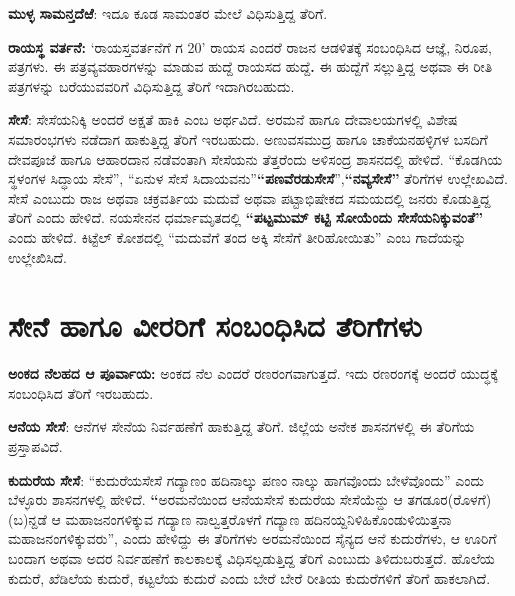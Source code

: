 \textbf{ಮುಳ್ಳ ಸಾಮನ್ತದೆಱೆ}: ಇದೂ ಕೂಡ ಸಾಮಂತರ ಮೇಲೆ ವಿಧಿಸುತ್ತಿದ್ದ ತೆರಿಗೆ.

\textbf{ರಾಯಸ್ಥ ವರ್ತನೆ:} ‘ರಾಯಸ್ತವರ್ತನೆಗೆ ಗ 20’ ರಾಯಸ ಎಂದರೆ ರಾಜನ ಆಡಳಿತಕ್ಕೆ ಸಂಬಂಧಿಸಿದ ಆಜ್ಞೆ, ನಿರೂಪ, ಪತ್ರಗಳು. ಈ ಪತ್ರವ್ಯವಹಾರಗಳನ್ನು ಮಾಡುವ ಹುದ್ದೆ ರಾಯಸದ ಹುದ್ದೆ\textbf{. } ಈ ಹುದ್ದೆಗೆ ಸಲ್ಲುತ್ತಿದ್ದ ಅಥವಾ ಈ ರೀತಿ ಪತ್ರಗಳನ್ನು ಬರೆಯುವವರಿಗೆ ವಿಧಿಸುತ್ತಿದ್ದ ತೆರಿಗೆ ಇದಾಗಿರಬಹುದು.

\textbf{ಸೇಸೆ}: ಸೇಸೆಯನಿಕ್ಕಿ ಅಂದರೆ ಅಕ್ಷತೆ ಹಾಕಿ ಎಂಬ ಅರ್ಥವಿದೆ. ಅರಮನೆ ಹಾಗೂ ದೇವಾಲಯಗಳಲ್ಲಿ ವಿಶೇಷ ಸಮಾರಂಭಗಳು ನಡೆದಾಗ ಹಾಕುತ್ತಿದ್ದ ತೆರಿಗೆ ಇರಬಹುದು. ಅಣುವಸಮುದ್ರ ಹಾಗೂ ಚಾಕೆಯನಹಳ್ಳಿಗಳ ಬಸದಿಗೆ ದೇವಪೂಜೆ ಹಾಗೂ ಆಹಾರದಾನ ನಡೆವಂತಾಗಿ ಸೇಸೆಯನು ತೆತ್ತರೆಂದು ಅಳಿಸಂದ್ರ ಶಾಸನದಲ್ಲಿ ಹೇಳಿದೆ. “ಕೊಡಗಿಯ ಸ್ಥಳಂಗಳ ಸಿದ್ಧಾಯ ಸೇಸೆ”, “ಏನುಳ ಸೇಸೆ ಸಿದಾಯವನು”\textbf{“ಪಣವೆರಡುಸೇಸೆ}”,\textbf{“ನವ್ಯಸೇಸೆ”} ತೆರಿಗೆಗಳ ಉಲ್ಲೇಖವಿದೆ. ಸೇಸೆ ಎಂಬುದು ರಾಜ ಅಥವಾ ಚಕ್ರವರ್ತಿಯ ಮದುವೆ ಅಥವಾ ಪಟ್ಟಾಭಿಷೇಕದ ಸಮಯದಲ್ಲಿ ಜನರು ಕೊಡುತ್ತಿದ್ದ ತೆರಿಗೆ ಎಂದು ಹೇಳಿದೆ. ನಯಸೇನನ ಧರ್ಮಾಮೃತದಲ್ಲಿ \textbf{“ಪಟ್ಟಮುಮ್ ಕಟ್ಟಿ ಸೋಯೆಂದು ಸೇಸೆಯನಿಕ್ಕುವಂತೆ”} ಎಂದು ಹೇಳಿದೆ. ಕಿಟ್ಟೆಲ್​ ಕೋಶದಲ್ಲಿ “ಮದುವೆಗೆ ತಂದ ಅಕ್ಕಿ ಸೇಸೆಗೆ ತೀರಿಹೋಯಿತು” ಎಂಬ ಗಾದೆಯನ್ನು ಉಲ್ಲೇಖಿಸಿದೆ.

\section*{ಸೇನೆ ಹಾಗೂ ವೀರರಿಗೆ ಸಂಬಂಧಿಸಿದ ತೆರಿಗೆಗಳು}

\textbf{ಅಂಕದ ನೆಲಹದ ಆ ಪೂರ್ವಾಯ:} ಅಂಕದ ನೆಲ ಎಂದರೆ ರಣರಂಗವಾಗುತ್ತದೆ. ಇದು ರಣರಂಗಕ್ಕೆ ಅಂದರೆ ಯುದ್ಧಕ್ಕೆ ಸಂಬಂಧಿಸಿದ ತೆರಿಗೆ ಇರಬಹುದು.

\textbf{ಆನೆಯ ಸೇಸೆ}: ಆನೆಗಳ ಸೇನೆಯ ನಿರ್ವಹಣೆಗೆ ಹಾಕುತ್ತಿದ್ದ ತೆರಿಗೆ. ಜಿಲ್ಲೆಯ ಅನೇಕ ಶಾಸನಗಳಲ್ಲಿ ಈ ತೆರಿಗೆಯ ಪ್ರಸ್ತಾಪವಿದೆ.

\textbf{ಕುದುರೆಯ ಸೇಸೆ}: “ಕುದುರೆಯಸೇಸೆ ಗದ್ಯಾಣಂ ಹದಿನಾಲ್ಕು ಪಣಂ ನಾಲ್ಕು ಹಾಗವೊಂದು ಬೇಳೆವೊಂದು” ಎಂದು ಬೆಳ್ಳೂರು ಶಾಸನಗಳಲ್ಲಿ ಹೇಳಿದೆ. \textbf{“}ಅರಮನೆಯಿಂದ ಆನೆಯಸೇಸೆ ಕುದುರೆಯ ಸೇಸೆಯೆನ್ದು ಆ ತಗಡೂರ(ರೊಳಗೆ) (ಬ)ನ್ದಡೆ ಆ ಮಹಾಜನಂಗಳಿಕ್ಕುವ ಗದ್ಯಾಣ ನಾಲ್ವತ್ತರೊಳಗೆ ಗದ್ಯಾಣ ಹದಿನಯ್ದನಿಳಿಹಿಕೊಂಡುಳಿಯಿತ್ತನಾ ಮಹಾಜನಂಗಳಿಕ್ಕು\-ವರು”, ಎಂದು ಹೇಳಿದ್ದು ಈ ತೆರಿಗೆಗಳು ಅರಮನೆಯಿಂದ ಸೈನ್ಯದ ಆನೆ ಕುದುರೆಗಳು, ಆ ಊರಿಗೆ ಬಂದಾಗ ಅಥವಾ ಅದರ ನಿರ್ವಹಣೆಗೆ ಕಾಲಕಾಲಕ್ಕೆ ವಿಧಿಸಲ್ಪಡುತ್ತಿದ್ದ ತೆರಿಗೆ ಎಂಬುದು ತಿಳಿದುಬರುತ್ತದೆ. ಹೊಲೆಯ ಕುದುರೆ, ಖೆಡಿಲೆಯ ಕುದುರೆ, ಕಟ್ಟಲೆಯ ಕುದುರೆ ಎಂದು ಬೇರೆ ಬೇರೆ ರೀತಿಯ ಕುದುರೆಗಳಿಗೆ ತೆರಿಗೆ ಹಾಕಲಾಗಿದೆ.

